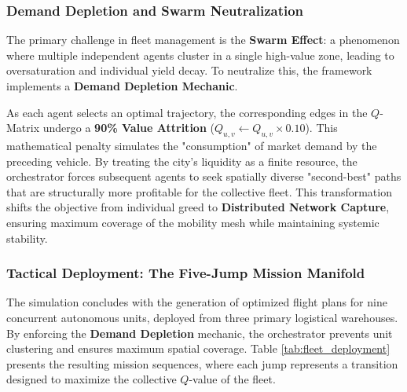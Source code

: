\subsubsection{Demand Depletion and Swarm Neutralization}

The primary challenge in fleet management is the \textbf{Swarm Effect}: a phenomenon where multiple independent agents cluster in a single high-value zone, leading to oversaturation and individual yield decay. To neutralize this, the framework implements a \textbf{Demand Depletion Mechanic}. 

As each agent selects an optimal trajectory, the corresponding edges in the $Q$-Matrix undergo a \textbf{90\% Value Attrition} ($Q_{u,v} \leftarrow Q_{u,v} \times 0.10$). This mathematical penalty simulates the "consumption" of market demand by the preceding vehicle. By treating the city’s liquidity as a finite resource, the orchestrator forces subsequent agents to seek spatially diverse "second-best" paths that are structurally more profitable for the collective fleet. This transformation shifts the objective from individual greed to \textbf{Distributed Network Capture}, ensuring maximum coverage of the mobility mesh while maintaining systemic stability.

\subsubsection{Tactical Deployment: The Five-Jump Mission Manifold}

The simulation concludes with the generation of optimized flight plans for nine concurrent autonomous units, deployed from three primary logistical warehouses. By enforcing the \textbf{Demand Depletion} mechanic, the orchestrator prevents unit clustering and ensures maximum spatial coverage. Table \ref{tab:fleet_deployment} presents the resulting mission sequences, where each jump represents a transition designed to maximize the collective $Q$-value of the fleet.

